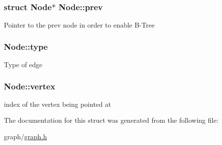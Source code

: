 \subsubsection[{\texorpdfstring{prev}{prev}}]{\setlength{\rightskip}{0pt plus 5cm}struct {\bf Node}$\ast$ Node\+::prev}\hypertarget{structNode_aea9fefc3628c3ce98b967e8addf06e88}{}\label{structNode_aea9fefc3628c3ce98b967e8addf06e88}
Pointer to the prev node in order to enable B-\/\+Tree 
\subsubsection[{\texorpdfstring{type}{type}}]{ Node\+::type}\hypertarget{structNode_ac79e156afe348762ebdbf52da3cab08d}{}\label{structNode_ac79e156afe348762ebdbf52da3cab08d}
Type of edge 
\subsubsection[{\texorpdfstring{vertex}{vertex}}]{ Node\+::vertex}\hypertarget{structNode_a45403751d539252e099c10eed80f22b6}{}\label{structNode_a45403751d539252e099c10eed80f22b6}
index of the vertex being pointed at 

The documentation for this struct was generated from the following file\+:\begin{DoxyCompactItemize}
\item 
graph/\hyperlink{graph_8h}{graph.\+h}\end{DoxyCompactItemize}

